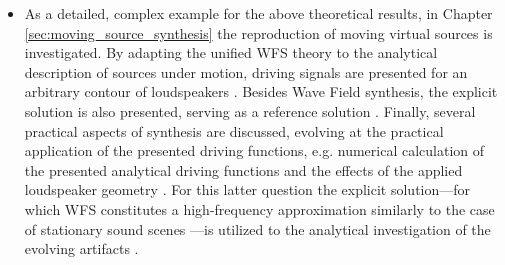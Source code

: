 \begin{itemize}
%
\item As a detailed, complex example for the above theoretical results, in Chapter \ref{sec:moving_source_synthesis} the reproduction of moving virtual sources is investigated.
By adapting the unified WFS theory to the analytical description of sources under motion, driving signals are presented for an arbitrary contour of loudspeakers \cite{Firtha2015:daga, firtha2016wave, doi:10.1121/1.4996126}.
Besides Wave Field synthesis, the explicit solution is also presented, serving as a reference solution \cite{Firtha2014:daga, Firtha2014:isma}.
Finally, several practical aspects of synthesis are discussed, evolving at the practical application of the presented driving functions, e.g. numerical calculation of the presented analytical driving functions and the effects of the applied loudspeaker geometry \cite{Firtha2018_daga_a}.
For this latter question the explicit solution---for which WFS constitutes a high-frequency approximation similarly to the case of stationary sound scenes \cite{firtha2015sound}---is utilized to the analytical investigation of the evolving artifacts \cite{firtha2016:daga}.
\end{itemize}
